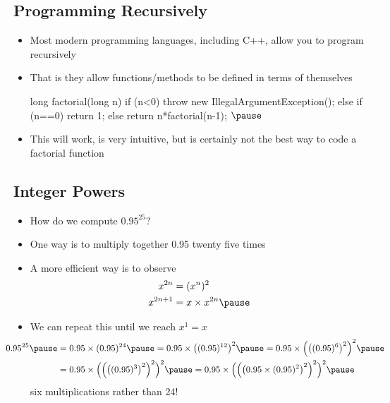 \begin{slide}
\section[-1]{Programming Recursively}

\begin{PauseHighLight}
  \begin{itemize}
  \item Most modern programming languages, including C++, allow you to
    program recursively\pause
  \item That is they allow functions/methods to be defined in terms of
    themselves
    \begin{cpp}
    long factorial(long n)
    {
        if (n<0)
            throw new IllegalArgumentException();
        else if (n==0)
            return 1;
        else
            return n*factorial(n-1);
    }$\pause$
    \end{cpp}
  \item This will work, is very intuitive, but is certainly not the best
    way to code a factorial function\pause
  \end{itemize}
\end{PauseHighLight}
\end{slide}


\begin{slide}
\section[-2]{Integer Powers}

\pausebuild
\begin{itemize}\squeeze
\item How do we compute $0.95^{25}$?\pause
\item One way is to multiply together 0.95 twenty five times\pause
\item A more efficient way is to observe
  \begin{align*}
    x^{2n} &= (x^n)^2 \\
    x^{2n+1} &= x\times x^{2n}\pause
  \end{align*}\vspace{-1cm}
\item We can repeat this until we reach $x^1=x$\pause
  \begin{align*}
    \hspace{-1cm}0.95^{25}\pause &= 0.95\times(0.95)^{24}\pause 
    = 0.95\times\bigl((0.95)^{12}\bigr)^2\pause
    = 0.95\times\Bigl(\bigl((0.95)^6\bigr)^2\Bigr)^2\pause \\
    &=0.95\times\Bigl(\Bigl(\bigl((0.95)^3\bigr)^2\Bigr)^2\Bigr)^2\pause
    =0.95\times\Bigl(\Bigl(\bigl(0.95\times(0.95)^2\bigr)^2\Bigr)^2\Bigr)^2
    \pause
  \end{align*}
  six multiplications rather than 24!\pause
\end{itemize}
\end{slide}



